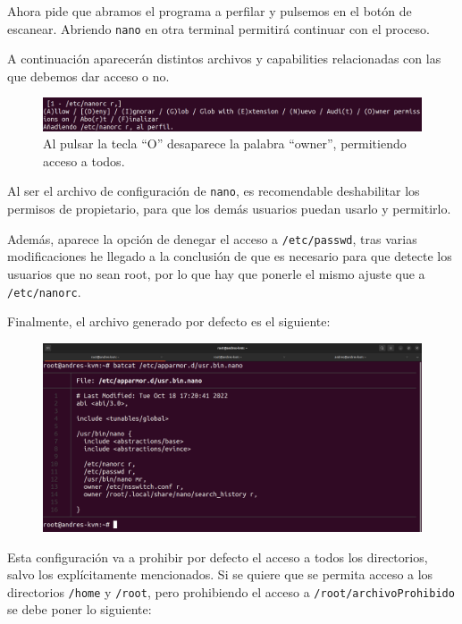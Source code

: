 \documentclass{article}
\begin{document}
Ahora pide que abramos el programa a perfilar y pulsemos en el botón de escanear. Abriendo \verb|nano| en otra terminal permitirá continuar con el proceso.

\bigskip

A continuación aparecerán distintos archivos y capabilities relacionadas con las que debemos dar acceso o no.


\begin{figure}[H]
    \centering
    \includegraphics[width=\textwidth]{imagenes/Captura desde 2022-10-18 17-11-50.png}
    \caption{Al pulsar la tecla ``O'' desaparece la palabra ``owner'', permitiendo acceso a todos.}
\end{figure}

Al ser el archivo de configuración de \verb|nano|, es recomendable deshabilitar los permisos de propietario, para que los demás usuarios puedan usarlo y permitirlo.

\bigskip

Además, aparece la opción de denegar el acceso a \verb|/etc/passwd|, tras varias modificaciones he llegado a la conclusión de que es necesario para que detecte los usuarios que no sean root, por lo que hay que ponerle el mismo ajuste que a \verb|/etc/nanorc|.

Finalmente, el archivo generado por defecto es el siguiente:
\begin{figure}[H]
    \centering
    \includegraphics[width=\textwidth]{imagenes/Captura desde 2022-10-18 17-23-45.png}
\end{figure}

Esta configuración va a prohibir por defecto el acceso a todos los directorios, salvo los explícitamente mencionados. Si se quiere que se permita acceso a los directorios \verb|/home| y \verb|/root|, pero prohibiendo el acceso a \verb|/root/archivoProhibido| se debe poner lo siguiente:
\end{document}
